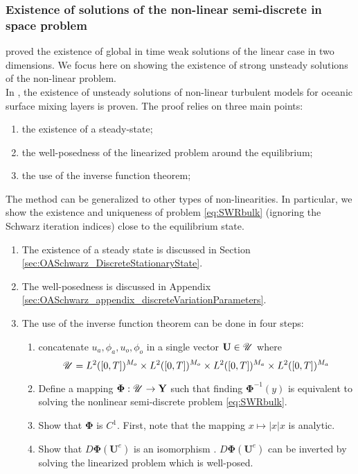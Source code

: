 \subsubsection{Existence of solutions of the
non-linear semi-discrete in space problem}
\cite{lions_mathematical_1995} proved the existence
of global in time weak solutions of the linear case in
two dimensions.
We focus here on showing the existence of strong
unsteady solutions of the non-linear problem.
\\
In \citep{chacon-rebollo_existence_2014},
the existence of unsteady solutions of
non-linear turbulent models for oceanic surface mixing layers is
proven.
The proof relies on three main points:
\begin{enumerate}
	\item the existence of a steady-state;
	\item the well-posedness of the linearized problem
	around the equilibrium;
	\item the use of the inverse function theorem;
\end{enumerate}
The method can be generalized to other types of
non-linearities. In particular, we show the existence and
uniqueness of problem \eqref{eq:SWRbulk}
(ignoring the Schwarz iteration indices) close to the
equilibrium state.
\begin{enumerate}
	\item The existence of a steady state is discussed in
	Section \ref{sec:OASchwarz_DiscreteStationaryState}.
	\item The well-posedness is discussed in Appendix
	\ref{sec:OASchwarz_appendix_discreteVariationParameters}.
	\item The use of the inverse function theorem can be
		done in four steps:
	\begin{enumerate}
		\item concatenate $u_a, \phi_a, u_o, \phi_o$ in
		a single vector $\mathbf{U}\in \mathbf{\cal U}$
		where
		\begin{equation}
			\mathbf{\cal U} = L^2([0,T])^{M_o} \times
			L^2([0,T])^{M_o} \times L^2([0,T])^{M_a}
			\times L^2([0,T])^{M_a}
		\end{equation}
		\item
		Define a mapping
		$\mathbf{\Phi}: \mathbf{\cal U}\rightarrow \mathbf{Y}$
		such that finding $\mathbf{\Phi}^{-1}(y)$ is equivalent
		to solving the nonlinear semi-discrete problem
			\eqref{eq:SWRbulk}.
		\item Show that $\mathbf{\Phi}$ is $C^1$.
			First, note that the mapping
			$x \mapsto |x|x$ is analytic.
		\item Show that $D\mathbf{\Phi}(\mathbf{U}^e)$
			is an isomorphism .
		$D\mathbf{\Phi}(\mathbf{U}^e)$ can
		be inverted by solving the linearized problem which
		is well-posed.
	\end{enumerate}
\end{enumerate}
